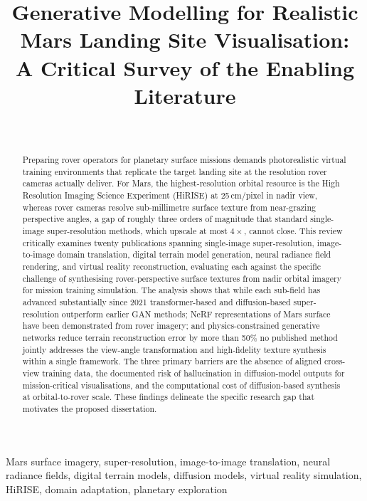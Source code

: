 \documentclass[10pt,journal]{IEEEtran}
\title{Generative Modelling for Realistic Mars Landing Site Visualisation:\\
       A Critical Survey of the Enabling Literature}
\author{%
  \IEEEauthorblockN{Deepakraj Rajmohan}\\
  \IEEEauthorblockA{\textit{Msc in Artificial Intelligence}\\
  University of Surrey\\
  deepak.dr036@gmail.com}
}
\begin{document}
\maketitle

\begin{abstract}
Preparing rover operators for planetary surface missions demands photorealistic
virtual training environments that replicate the target landing site at the
resolution rover cameras actually deliver. For Mars, the highest-resolution
orbital resource is the High Resolution Imaging Science Experiment (HiRISE) at
25\,cm/pixel in nadir view, whereas rover cameras resolve sub-millimetre surface
texture from near-grazing perspective angles, a gap of roughly three orders of
magnitude that standard single-image super-resolution methods, which upscale at
most $4\times$, cannot close. This review critically examines twenty publications
spanning single-image super-resolution, image-to-image domain translation,
digital terrain model generation, neural radiance field rendering, and virtual
reality reconstruction, evaluating each against the specific challenge of
synthesising rover-perspective surface textures from nadir orbital imagery for
mission training simulation. The analysis shows that while each sub-field has
advanced substantially since 2021 transformer-based and diffusion-based
super-resolution outperform earlier GAN methods; NeRF representations of Mars
surface have been demonstrated from rover imagery; and physics-constrained
generative networks reduce terrain reconstruction error by more than
50\% no published method jointly addresses the view-angle transformation and
high-fidelity texture synthesis within a single framework. The three primary
barriers are the absence of aligned cross-view training data, the documented
risk of hallucination in diffusion-model outputs for mission-critical
visualisations, and the computational cost of diffusion-based synthesis at
orbital-to-rover scale. These findings delineate the specific research gap that
motivates the proposed dissertation.
\end{abstract}

\begin{IEEEkeywords}
Mars surface imagery, super-resolution, image-to-image translation, neural
radiance fields, digital terrain models, diffusion models, virtual reality
simulation, HiRISE, domain adaptation, planetary exploration
\end{IEEEkeywords}
\end{document}
